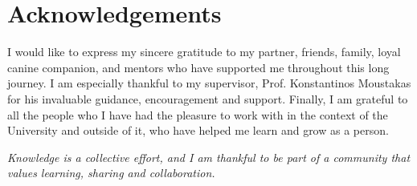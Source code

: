 \chapter*{Acknowledgements}

I would like to express my sincere gratitude to my partner, friends, family, loyal canine companion, and mentors who have supported me throughout this long journey. I am especially thankful
to my supervisor, Prof. Konstantinos Moustakas for his invaluable guidance, encouragement and support.
Finally, I am grateful to all the people who I have had the pleasure to work with in the context of the University and outside of it, who have helped me learn and
grow as a person.

\begin{center}
\textit{Knowledge is a collective effort, and I am thankful to be part of a community that values learning, sharing and collaboration.}
\end{center}
\cleardoublepage
